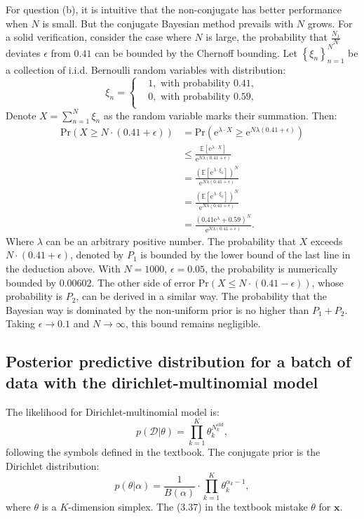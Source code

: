 \documentclass[UTF8]{ctexart}
\begin{document}
For question (b), it is intuitive that the non-conjugate has better performance when $N$ is small.
But the conjugate Bayesian method prevails with $N$ grows.
For a solid verification, consider the case where $N$ is large, the probability that $\frac{N_{1}}{N}$ deviates $\epsilon$ from $0.41$ can be bounded by the Chernoff bounding.
Let $\left\{\xi_{n}\right\}_{n=1}^{N}$ be a collection of i.i.d. Bernoulli random variables with distribution:
$$
\xi_{n}=\left\{
\begin{aligned}
&1,\text{ with probability 0.41},\\
&0,\text{ with probability 0.59},\\
\end{aligned}
\right.
$$
Denote $X=\sum_{n=1}^{N}\xi_{n}$ as the random variable marks their summation.
Then:
$$
\begin{aligned}
\text{Pr}(X\geq N\cdot(0.41+\epsilon))&=\text{Pr}(\text{e}^{\lambda\cdot X}\geq \text{e}^{N\lambda(0.41+\epsilon)})\\
&\leq \frac{\mathbb{E}[\text{e}^{\lambda\cdot X}]}{\text{e}^{N\lambda(0.41+\epsilon)}}\\
&=\frac{\left(\mathbb{E}[\text{e}^{\lambda\cdot\xi_{0}}]\right)^{N}}{\text{e}^{N\lambda(0.41+\epsilon)}}\\
&=\frac{\left(\mathbb{E}[\text{e}^{\lambda\cdot\xi_{0}}]\right)^{N}}{\text{e}^{N\lambda(0.41+\epsilon)}}\\
&=\frac{\left(0.41\text{e}^{\lambda}+0.59\right)^{N}}{\text{e}^{N\lambda(0.41+\epsilon)}}.
\end{aligned}
$$
Where $\lambda$ can be an arbitrary positive number.
The probability that $X$ exceeds $N\cdot(0.41+\epsilon)$, denoted by $P_{1}$ is bounded by the lower bound of the last line in the deduction above.
With $N=1000$, $\epsilon=0.05$, the probability is numerically bounded by $0.00602$.
The other side of error $\text{Pr}(X\leq N\cdot(0.41-\epsilon))$, whose probability is $P_{2}$, can be derived in a similar way.
The probability that the Bayesian way is dominated by the non-uniform prior is no higher than $P_{1}+P_{2}$.
Taking $\epsilon\rightarrow 0.1$ and $N\rightarrow \infty$, this bound remains negligible.



\subsection{Posterior predictive distribution for a batch of data with the dirichlet-multinomial model}
The likelihood for Dirichlet-multinomial model is:
$$p(\mathcal{D}|\theta)=\prod_{k=1}^{K}\theta_{k}^{N_{k}^{\text{old}}},$$
following the symbols defined in the textbook.
The conjugate prior is the Dirichlet distribution:
$$p(\theta|\alpha)=\frac{1}{B(\alpha)}\cdot\prod_{k=1}^{K}\theta_{k}^{\alpha_{k}-1},$$
where $\theta$ is a $K$-dimension simplex.
The (3.37) in the textbook mistake $\theta$ for $\textbf{x}$.
\end{document}
